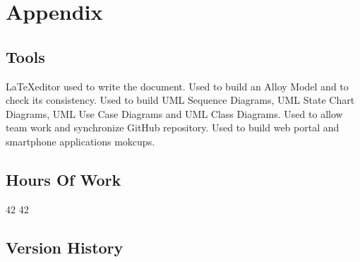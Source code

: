 \section{Appendix}
%
\subsection{Tools}
\begin{itemize}
	 \LaTeX editor used to write the document.
	 Used to build an Alloy Model and to check its consistency.
	 Used to build UML Sequence Diagrams, UML State Chart Diagrams, UML Use Case Diagrams and UML Class Diagrams.
	 Used to allow team work and synchronize GitHub repository.
	 Used to build web portal and smartphone applications mokcups.
\end{itemize}
%
\subsection{Hours Of Work}
\begin{itemize}
	 42
	 42
\end{itemize}
%
\subsection{Version History}
